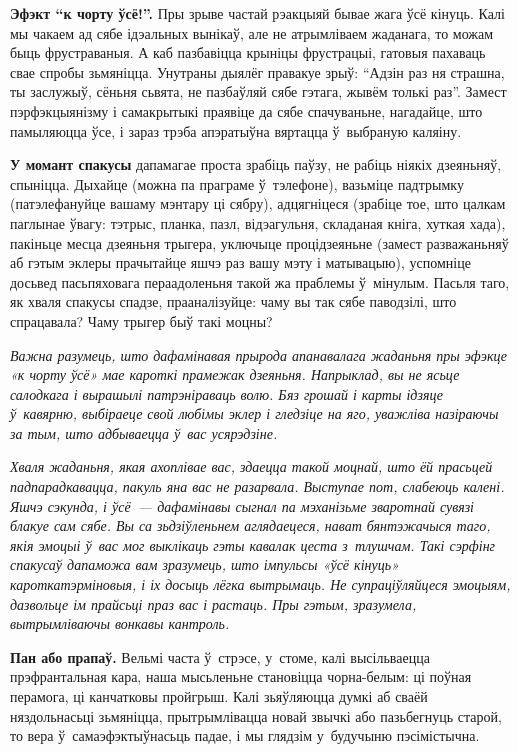 
\textbf{Эфэкт ``к чорту ўсё!''.} Пры зрыве частай рэакцыяй бывае жага ўсё кінуць. Калі мы чакаем ад сябе ідэальных вынікаў, але не атрымліваем жаданага, то можам быць фрустраваныя. А каб пазбавіцца крыніцы фрустрацыі, гатовыя пахаваць свае спробы зьмяніцца. Унутраны дыялёг правакуе зрыў: ``Адзін раз ня страшна, ты заслужыў, сёньня сьвята, не пазбаўляй сябе гэтага, жывём толькі раз''. Замест пэрфэкцыянізму і самакрытыкі праявіце да сябе спачуваньне, нагадайце, што памыляюцца ўсе, і зараз трэба апэратыўна вяртацца ў~выбраную каляіну.

\textbf{У момант спакусы} дапамагае проста зрабіць паўзу, не рабіць ніякіх дзеяньняў, спыніцца. Дыхайце (можна па праграме ў~тэлефоне), вазьміце падтрымку (патэлефануйце вашаму мэнтару ці сябру), адцягніцеся (зрабіце тое, што цалкам паглынае ўвагу: тэтрыс, планка, пазл, відэагульня, складаная кніга, хуткая хада), пакіньце месца дзеяньня трыгера, уключыце процідзеяньне (замест разважаньняў аб гэтым эклеры прачытайце яшчэ раз вашу мэту і матывацыю), успомніце досьвед пасьпяховага пераадоленьня такой жа праблемы ў~мінулым. Пасьля таго, як хваля спакусы спадзе, прааналізуйце: чаму вы так сябе паводзілі, што спрацавала? Чаму трыгер быў такі моцны?

\emph{Важна разумець, што дафамінавая прырода апанавалага жаданьня пры эфэкце «к чорту ўсё» мае кароткі прамежак дзеяньня. Напрыклад, вы не ясьце салодкага і вырашылі патрэніраваць волю. Бяз грошай і карты ідзяце ў~кавярню, выбіраеце свой любімы эклер і гледзіце на яго, уважліва назіраючы за тым, што адбываецца ў~вас усярэдзіне.}

\emph{Хваля жаданьня, якая ахоплівае вас, здаецца такой моцнай, што ёй прасьцей падпарадкавацца, пакуль яна вас не разарвала. Выступае пот, слабеюць калені. Яшчэ сэкунда, і ўсё~--- дафамінавы сыгнал па мэханізьме зваротнай сувязі блакуе сам сябе. Вы са зьдзіўленьнем аглядаецеся, нават бянтэжачыся таго, якія эмоцыі ў~вас мог выклікаць гэты кавалак цеста з~тлушчам. Такі сэрфінг спакусаў дапаможа вам зразумець, што імпульсы «ўсё кінуць» кароткатэрміновыя, і іх досыць лёгка вытрымаць. Не супраціўляйцеся эмоцыям, дазвольце ім прайсьці праз вас і растаць. Пры гэтым, зразумела, вытрымліваючы вонкавы кантроль.}

\textbf{Пан або прапаў.} Вельмі часта ў~стрэсе, у~стоме, калі высільваецца прэфрантальная кара, наша мысьленьне становіцца чорна-белым: ці поўная перамога, ці канчатковы пройгрыш. Калі зьяўляюцца думкі аб сваёй няздольнасьці зьмяніцца, прытрымлівацца новай звычкі або пазьбегнуць старой, то вера ў~самаэфэктыўнасьць падае, і мы глядзім у~будучыню пэсімістычна.

